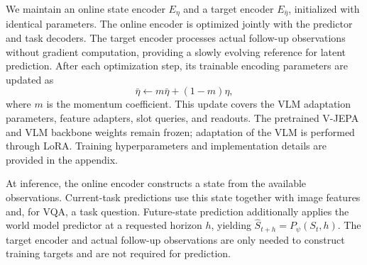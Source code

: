 We maintain an online state encoder $E_{\eta}$ and a target encoder $E_{\bar{\eta}}$, initialized with identical parameters. The online encoder is optimized jointly with the predictor and task decoders. The target encoder processes actual follow-up observations without gradient computation, providing a slowly evolving reference for latent prediction. After each optimization step, its trainable encoding parameters are updated as
\begin{equation}
    \bar{\eta}\leftarrow m\bar{\eta}+(1-m)\eta,
    \label{eq:target_ema}
\end{equation}
where $m$ is the momentum coefficient. This update covers the VLM adaptation parameters, feature adapters, slot queries, and readouts. The pretrained V-JEPA and VLM backbone weights remain frozen; adaptation of the VLM is performed through LoRA. Training hyperparameters and implementation details are provided in the appendix.

At inference, the online encoder constructs a state from the available observations. Current-task predictions use this state together with image features and, for VQA, a task question. Future-state prediction additionally applies the world model predictor at a requested horizon $h$, yielding $\hat{S}_{t+h}=P_{\psi}(S_t,h)$. The target encoder and actual follow-up observations are only needed to construct training targets and are not required for prediction.
